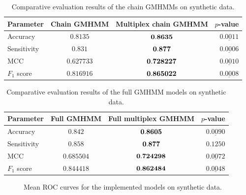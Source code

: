 \documentclass[12pt,a4paper,twoside,openright]{report}
\begin{document}
\begin{table}[h]\centering
\begin{tabular}{ l c c r } \toprule
{\bf Parameter} & {\bf Chain GMHMM} & {\bf Multiplex chain GMHMM} & {\bf $p$-value} \\ \midrule
Accuracy & $0.8135$ & $\bf 0.8635$ & $\underline{0.0011}$\\
Sensitivity & $0.831$ & $\bf 0.877$ & $\underline{0.0006}$\\
MCC & $0.627733$ & $\bf 0.728227$ & $\underline{0.0010}$\\
$F_1$ score & $0.816916$ & $\bf 0.865022$ & $\underline{0.0008}$\\
\bottomrule
\end{tabular}
\caption[Evaluation results on the chain GMHMM on synthetic data]{\centering Comparative evaluation results of the chain GMHMMs on synthetic data.}\label{tblsyndata1}
\end{table}
\begin{table}[h]\centering
\begin{tabular}{ l c c r } \toprule
{\bf Parameter} & {\bf Full GMHMM} & {\bf Full multiplex GMHMM} & {\bf $p$-value} \\ \midrule
Accuracy & $0.842$ & $\bf 0.8605$ & $\underline{0.0090}$\\
Sensitivity & $0.858$ & $\bf 0.877$ & $0.1250$\\
MCC & $0.685504$ & $\bf 0.724298$ & $\underline{0.0072}$\\
$F_1$ score & $0.844418$ & $\bf 0.862484$ & $\underline{0.0048}$\\
\bottomrule
\end{tabular}
\caption[Evaluation results on the full GMHMMs on synthetic data]{\centering Comparative evaluation results of the full GMHMM models on synthetic data.}\label{tblsyndata2}
\end{table}
\begin{figure}[p]\centering
{}

\caption{Mean ROC curves for the implemented models on synthetic data.}\label{figrocsyn1}
\end{figure}
\end{document}
